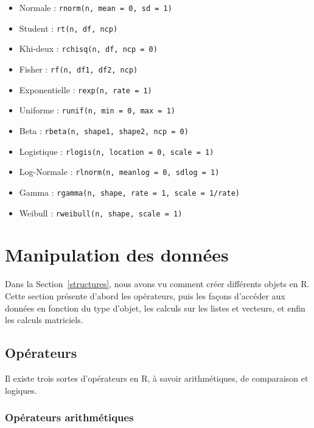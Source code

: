 \documentclass[
  11pt,
]{book}
\providecommand{\tightlist}{%
  \setlength{\itemsep}{0pt}\setlength{\parskip}{0pt}}
\numberwithin{equation}{section}
\numberwithin{countremarque}{section}
\begin{document}
\begin{itemize}
\tightlist
\item
  Normale : \texttt{rnorm(n,\ mean\ =\ 0,\ sd\ =\ 1)}
\item
  Student : \texttt{rt(n,\ df,\ ncp)}
\item
  Khi-deux : \texttt{rchisq(n,\ df,\ ncp\ =\ 0)}
\item
  Fisher : \texttt{rf(n,\ df1,\ df2,\ ncp)}
\item
  Exponentielle : \texttt{rexp(n,\ rate\ =\ 1)}
\item
  Uniforme : \texttt{runif(n,\ min\ =\ 0,\ max\ =\ 1)}
\item
  Beta : \texttt{rbeta(n,\ shape1,\ shape2,\ ncp\ =\ 0)}
\item
  Logistique : \texttt{rlogis(n,\ location\ =\ 0,\ scale\ =\ 1)}
\item
  Log-Normale : \texttt{rlnorm(n,\ meanlog\ =\ 0,\ sdlog\ =\ 1)}
\item
  Gamma : \texttt{rgamma(n,\ shape,\ rate\ =\ 1,\ scale\ =\ 1/rate)}
\item
  Weibull : \texttt{rweibull(n,\ shape,\ scale\ =\ 1)}
\end{itemize}

\hypertarget{manipulation-des-donnuxe9es}{%
\section{Manipulation des données}\label{manipulation-des-donnuxe9es}}

Dans la Section~\ref{structures}, nous avons vu comment créer différents objets en R. Cette section présente d'abord les opérateurs, puis les façons d'accéder aux données en fonction du type d'objet, les calculs sur les listes et vecteurs, et enfin les calculs matriciels.

\hypertarget{opuxe9rateurs}{%
\subsection{Opérateurs}\label{opuxe9rateurs}}

Il existe trois sortes d'opérateurs en R, à savoir arithmétiques, de comparaison et logiques.

\hypertarget{opuxe9rateurs-arithmuxe9tiques}{%
\subsubsection{Opérateurs arithmétiques}\label{opuxe9rateurs-arithmuxe9tiques}}
\end{document}
